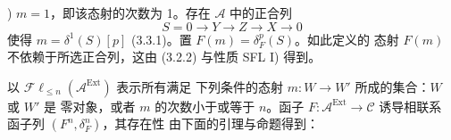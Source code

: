 ) $m=1$，即该态射的次数为 1。存在 $\mathcal A$ 中的正合列
\[
S=0\longrightarrow Y\longrightarrow Z\longrightarrow X\longrightarrow0
\]
使得 $m=\delta^1(S)[p]$ (3.3.1)。置 $F(m)=\delta_F^p(S)$。如此定义的
态射 $F(m)$ 不依赖于所选正合列，这由 (3.2.2) 与性质 SFL I) 得到。

以 $\mathcal{F}\ell_{\leq n}(\mathcal A^{\operatorname{Ext}})$ 表示所有满足
下列条件的态射 $m\colon W\longrightarrow W'$ 所成的集合：$W$ 或 $W'$ 是
零对象，或者 $m$ 的次数小于或等于 $n$。函子
$F\colon\mathcal A^{\operatorname{Ext}}\longrightarrow\mathcal C$ 诱导相联系
函子列 $(F^n,\delta_F^n)$，其存在性
由下面的引理与命题得到：
\endgroup
